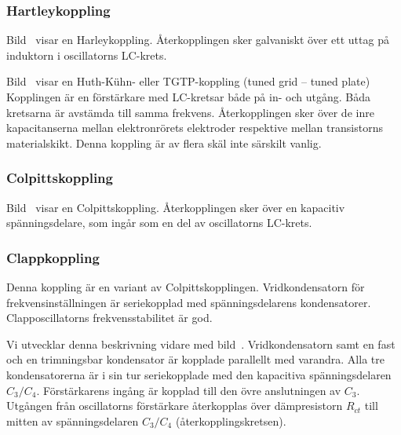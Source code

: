 \subsubsection{Hartleykoppling}


Bild~ visar en Harleykoppling.
%
Återkopplingen sker galvaniskt över ett uttag på induktorn i oscillatorns
LC-krets.

Bild~ visar en Huth-Kühn- eller TGTP-kopp\-ling
(tuned grid -- tuned plate)
%
Kopplingen är en förstärkare med LC-kretsar både på in- och utgång.
Båda kretsarna är avstämda till samma frekvens.
Återkopplingen sker över de inre kapacitanserna mellan elektronrörets elektroder
respektive mellan transistorns materialskikt.
Denna koppling är av flera skäl inte särskilt vanlig.

\subsubsection{Colpittskoppling}

Bild~ visar en Colpittskoppling.
%
Återkopplingen sker över en kapacitiv spänningsdelare, som ingår som
en del av oscillatorns LC-krets.

\subsubsection{Clappkoppling}

Denna koppling är en variant av Colpittskopplingen.
Vridkondensatorn för frekvensinställningen är seriekopplad med spänningsdelarens
kondensatorer.
Clapposcillatorns frekvensstabilitet är god.

Vi utvecklar denna beskrivning vidare med bild~.
Vridkondensatorn samt en fast och en trimningsbar kondensator är kopplade
parallellt med varandra.
Alla tre kondensatorerna är i sin tur seriekopplade med den kapacitiva
spänningsdelaren \(C_3/C_4\).
Förstärkarens ingång är kopplad till den övre anslutningen av \(C_3\).
Utgången från oscillatorns förstärkare återkopplas över dämpresistorn
\(R_{ct}\) till mitten av spänningsdelaren \(C_3/C_4\)
(återkopplingskretsen).

